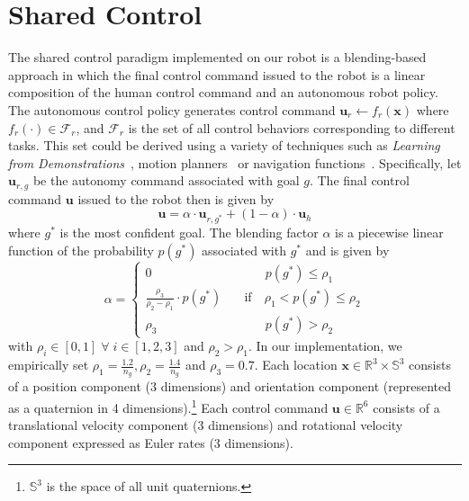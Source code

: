 \section{Shared Control}\label{sec:shared-control}
The shared control paradigm implemented on our robot is a blending-based approach in  which the final control command issued to the robot is a linear composition of the human control command and an autonomous robot policy.
The autonomous control policy generates control command
$\boldsymbol{u}_r \leftarrow f_{r}(\boldsymbol{x})$
where $f_{r}(\cdot) \in \mathcal{F}_{r}$, and $\mathcal{F}_{r}$ is the set of all control behaviors corresponding to different tasks. This set could be derived using a variety of techniques such as \textit{Learning from Demonstrations}~\cite{argall2009survey, schaal1997learning}, motion planners~\cite{hsu2002randomized,ratliff2009chomp} or navigation functions~\cite{rimon1992exact,tanner2003nonholonomic}. Specifically, let $\boldsymbol{u}_{r,g}$ be the autonomy command associated with goal $g$. The final control command $\boldsymbol{u}$ issued to the robot then is given by
\begin{equation*}
\boldsymbol{u} = \alpha\cdot \boldsymbol{u}_{r,g^*} + (1 - \alpha)\cdot \boldsymbol{u}_h
\end{equation*}
where $g^*$ is the most confident goal. The blending factor $\alpha$ is a piecewise linear function of the probability $p(g^*)$ associated with $g^*$ and is given by
$$
\alpha = \left\{
\begin{array}{ll}
0 & \quad\quad~~~ p(g^*) \leq \rho_1 \\
\frac{\rho_3}{\rho_2 - \rho_1}\cdot p(g^*) &  \quad \text{if}\quad \rho_1 < p(g^*) \leq \rho_2  \\
\rho_3 & \quad\quad~~~ p(g^*) > \rho_2 	
\end{array}
\right.
$$
with $\rho_i \in [0, 1] \;\forall\; i \in [1,2,3]$ and $ \rho_2 > \rho_1$. 
In our implementation, we empirically set $\rho_1 = \frac{1.2}{n_g}, \rho_2 = \frac{1.4}{n_g}$ and $ \rho_3 = 0.7$. Each location $\boldsymbol{x} \in \mathbb{R}^3 \times \mathbb{S}^3$ consists of a position component (3 dimensions) and orientation component (represented as a quaternion in 4 dimensions).\footnote{$\mathbb{S}^3$ is the space of all unit quaternions.} Each control command $\boldsymbol{u} \in \mathbb{R}^6$ consists of a translational velocity component (3 dimensions) and rotational velocity component expressed as Euler rates (3 dimensions).


